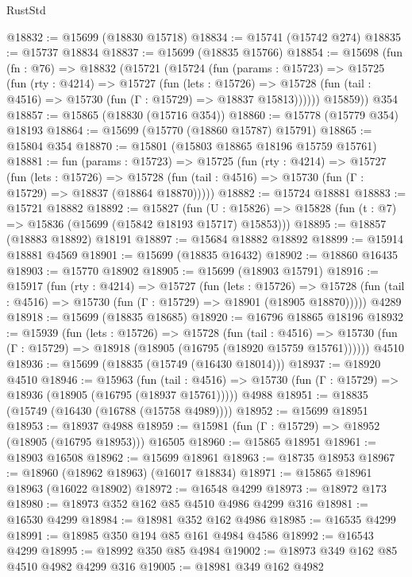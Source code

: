 \begin{lexlean}{RustStd}
\begin{coremodule}
@18832 := @15699 (@18830 @15718)
@18834 := @15741 (@15742 @274)
@18835 := @15737 @18834
@18837 := @15699 (@18835 @15766)
@18854 := @15698
    (fun (fn : @76) =>
    @18832
      (@15721
        (@15724
          (fun (params : @15723) =>
          @15725
            (fun (rty : @4214) =>
            @15727
              (fun (lets : @15726) =>
              @15728 (fun (tail : @4516) => @15730 (fun (Γ : @15729) => @18837 @15813))))))
        @15859))
    @354
@18857 := @15865 (@18830 (@15716 @354))
@18860 := @15778 (@15779 @354) @18193
@18864 := @15699 (@15770 (@18860 @15787) @15791)
@18865 := @15804 @354
@18870 := @15801 (@15803 @18865 @18196 @15759 @15761)
@18881 := fun (params : @15723) =>
  @15725
    (fun (rty : @4214) =>
    @15727
      (fun (lets : @15726) =>
      @15728 (fun (tail : @4516) => @15730 (fun (Γ : @15729) => @18837 (@18864 @18870)))))
@18882 := @15724 @18881
@18883 := @15721 @18882
@18892 := @15827
    (fun (U : @15826) => @15828 (fun (t : @7) => @15836 (@15699 (@15842 @18193 @15717) @15853)))
@18895 := @18857 (@18883 @18892) @18191
@18897 := @15684 @18882 @18892
@18899 := @15914 @18881 @4569
@18901 := @15699 (@18835 @16432)
@18902 := @18860 @16435
@18903 := @15770 @18902
@18905 := @15699 (@18903 @15791)
@18916 := @15917
    (fun (rty : @4214) =>
    @15727
      (fun (lets : @15726) =>
      @15728 (fun (tail : @4516) => @15730 (fun (Γ : @15729) => @18901 (@18905 @18870)))))
    @4289
@18918 := @15699 (@18835 @18685)
@18920 := @16796 @18865 @18196
@18932 := @15939
    (fun (lets : @15726) =>
    @15728
      (fun (tail : @4516) =>
      @15730 (fun (Γ : @15729) => @18918 (@18905 (@16795 (@18920 @15759 @15761))))))
    @4510
@18936 := @15699 (@18835 (@15749 (@16430 @18014)))
@18937 := @18920 @4510
@18946 := @15963
    (fun (tail : @4516) => @15730 (fun (Γ : @15729) => @18936 (@18905 (@16795 (@18937 @15761)))))
    @4988
@18951 := @18835 (@15749 (@16430 (@16788 (@15758 @4989))))
@18952 := @15699 @18951
@18953 := @18937 @4988
@18959 := @15981 (fun (Γ : @15729) => @18952 (@18905 (@16795 @18953))) @16505
@18960 := @15865 @18951
@18961 := @18903 @16508
@18962 := @15699 @18961
@18963 := @18735 @18953
@18967 := @18960 (@18962 @18963) (@16017 @18834)
@18971 := @15865 @18961 @18963 (@16022 @18902)
@18972 := @16548 @4299
@18973 := @18972 @173
@18980 := @18973 @352 @162 @85 @4510 @4986 @4299 @316
@18981 := @16530 @4299
@18984 := @18981 @352 @162 @4986
@18985 := @16535 @4299
@18991 := @18985 @350 @194 @85 @161 @4984 @4586
@18992 := @16543 @4299
@18995 := @18992 @350 @85 @4984
@19002 := @18973 @349 @162 @85 @4510 @4982 @4299 @316
@19005 := @18981 @349 @162 @4982

\end{coremodule}
\end{lexlean}
